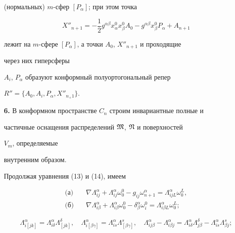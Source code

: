 (нормальных) $m$-сфер $[P_\alpha]$; при этом точка 


\begin{equation} 


X''_{n+1}=-\frac{1}{2}g^{\alpha\beta}x^0_\alpha x^0_\beta A_0- 


g^{\alpha\beta}x^0_\beta P_\alpha+A_{n+1} 


\end{equation} 


лежит на $m$-сфере $[P_\alpha]$, а точки $A_0$, $X''_{n+1}$ и проходящие 


через них гиперсферы 


$A_i$, $P_\alpha$ образуют конформный полуортогональный репер 


$R''=\{A_0,A_i,P_\alpha,X''_{n_+1}\}$. 


\medskip 


 


{\bf 6.} В конформном пространстве $C_n$ строим инвариантные полные и 


частичные оснащения распределений $\frak M$, $\frak N$ и поверхностей 


$V_m$, определяемые 


внутренним образом. 


Продолжая уравнения (13) и (14), имеем 


\begin{equation} 


\begin{split} 


\text{(а)}\quad & \nabla \Lambda^\alpha_{ij}+\Lambda^\alpha_{ij} 


\omega^0_0-g_{ij}\omega^\alpha_{n+1}=\Lambda^\alpha_{ij L}\omega^L_0,\\ 


% 


\text{(б)}\quad & \nabla \Lambda^\alpha_{i\beta}+\Lambda^\alpha_{i\beta} 


\omega^0_0-\delta^\alpha_\beta\omega^0_i= 


\Lambda^\alpha_{i\beta L}\omega^L_0; 


\end{split} 


\end{equation} 


\begin{equation} 


\Lambda^\alpha_{i[j k]}=\Lambda^\alpha_{i\delta} 


\Lambda^\delta_{[j k]},\quad 


% 


\Lambda^\alpha_{i[\beta\gamma]}=\Lambda^\alpha_{is} 


\Lambda^s_{[\beta\gamma]},\quad 


% 


\Lambda^\alpha_{ij\beta}-\Lambda^\alpha_{i\beta j}= 


\Lambda^\alpha_{i\delta}\Lambda^\delta_{j\beta}- 


\Lambda^\alpha_{is}\Lambda^s_{\beta j}; 


\end{equation} 


